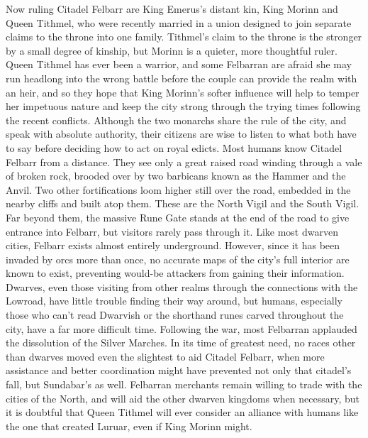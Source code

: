 \documentclass[10pt,a4paper,twoside,twocolumn,openany,bg=print,nodeprecatedcode]{dndbook}
\begin{document}
Now ruling Citadel Felbarr are King Emerus's distant kin, King Morinn and Queen Tithmel, who were recently married in a union designed to join separate claims to the throne into one family. Tithmel's claim to the throne is the stronger by a small degree of kinship, but Morinn is a quieter, more thoughtful ruler. Queen Tithmel has ever been a warrior, and some Felbarran are afraid she may run headlong into the wrong battle before the couple can provide the realm with an heir, and so they hope that King Morinn's softer influence will help to temper her impetuous nature and keep the city strong through the trying times following the recent conflicts. Although the two monarchs share the rule of the city, and speak with absolute authority, their citizens are wise to listen to what both have to say before deciding how to act on royal edicts.
Most humans know Citadel Felbarr from a distance. They see only a great raised road winding through a vale of broken rock, brooded over by two barbicans known as the Hammer and the Anvil. Two other fortifications loom higher still over the road, embedded in the nearby cliffs and built atop them. These are the North Vigil and the South Vigil. Far beyond them, the massive Rune Gate stands at the end of the road to give entrance into Felbarr, but visitors rarely pass through it.
Like most dwarven cities, Felbarr exists almost entirely underground. However, since it has been invaded by orcs more than once, no accurate maps of the city's full interior are known to exist, preventing would-be attackers from gaining their information. Dwarves, even those visiting from other realms through the connections with the Lowroad, have little trouble finding their way around, but humans, especially those who can't read Dwarvish or the shorthand runes carved throughout the city, have a far more difficult time.
Following the war, most Felbarran applauded the dissolution of the Silver Marches. In its time of greatest need, no races other than dwarves moved even the slightest to aid Citadel Felbarr, when more assistance and better coordination might have prevented not only that citadel's fall, but Sundabar's as well. Felbarran merchants remain willing to trade with the cities of the North, and will aid the other dwarven kingdoms when necessary, but it is doubtful that Queen Tithmel will ever consider an alliance with humans like the one that created Luruar, even if King Morinn might.
\end{document}
